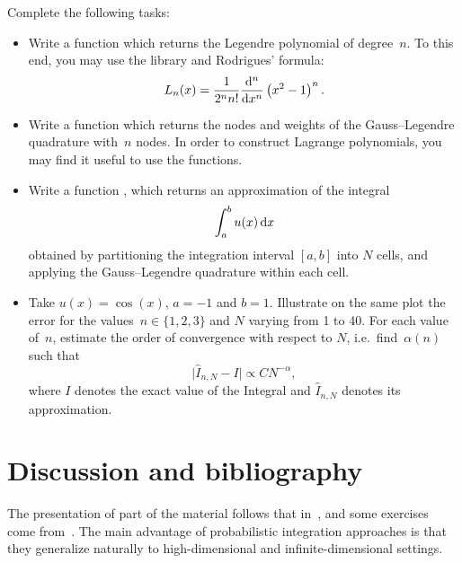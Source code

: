 \begin{compexercise}
    Complete the following tasks:
    \begin{itemize}
        \item
            Write a function  which returns the Legendre polynomial of degree~$n$.
            To this end, you may use the  library and Rodrigues' formula:
            \[
                L_n(x) = \frac{1}{2^n n!} \frac{\mathrm d^n}{\mathrm d x^n} \left(x^2 - 1\right)^n.
            \]

        \item
            Write a function  which returns the nodes and weights of the Gauss--Legendre quadrature with~$n$ nodes.
            In order to construct Lagrange polynomials,
            you may find it useful to use the  functions.

        \item
            Write a function ,
            which returns an approximation of the integral
            \[
                \int_{a}^{b} u(x) \, \mathrm d x
            \]
            obtained by partitioning the integration interval $[a, b]$ into $N$ cells,
            and applying the Gauss--Legendre quadrature within each cell.

        \item
            Take $u(x) = \cos(x)$, $a = -1$ and $b = 1$.
            Illustrate on the same plot the error for the values~$n \in \{1, 2, 3\}$ and $N$ varying from 1 to 40.
            For each value of~$n$, estimate the order of convergence with respect to $N$, i.e.\ find~$\alpha(n)$ such that
            \[
                \lvert \widehat I_{n, N} - I \rvert \propto C N^{-\alpha},
            \]
            where $I$ denotes the exact value of the Integral
            and $\widehat I_{n, N}$ denotes its approximation.
    \end{itemize}
\end{compexercise}

\section{Discussion and bibliography}
The presentation of part of the material follows that in~\cite{Legat},
and some exercises come from~\cite[Chapter 9]{MR2265914}.
The main advantage of probabilistic integration approaches is that
they generalize naturally to high-dimensional and infinite-dimensional settings.
